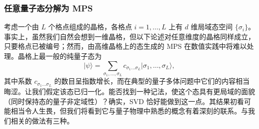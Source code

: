 \documentclass[a4paper,10pt,oneside,onecolumn,1p,times]{elsarticle}
\newcommand{\ket}[1]{\mbox{$| #1  \rangle$}}
\begin{document}
\subsubsection{任意量子态分解为 MPS}
\label{subsubsec:MPSdecomposition}
考虑一个由 $L$ 个格点组成的晶格，各格点 $i=1,\ldots,L$ 上有 $d$ 维局域态空间 $\{ \sigma_i \}$。事实上，虽然我们自然会想到一维晶格，但以下论述对任意维度的晶格同样成立，只要格点已被编号；然而，由高维晶格上的态生成的 MPS 在数值实践中将难以处理。晶格上最一般的纯量子态为
\begin{equation}
\ket{\psi} = \sum_{\sigma_1,\ldots,\sigma_L} c_{\sigma_1 \ldots \sigma_L} \ket{\sigma_1,\ldots,\sigma_L},
\end{equation}
其中系数 $c_{\sigma_1 \ldots \sigma_L}$ 的数目呈指数增长，而在典型的量子多体问题中它们的内容相当晦涩。让我们假定该态已归一化。能否找到一种记法，使这个态具有更局域的面貌（同时保持态的量子非定域性）？确实，SVD 恰好能做到这一点。其结果初看可能相当令人生畏，但我们将看到它与量子物理中熟悉的概念有着深刻的联系。与我们相关的做法有三种。
\end{document}
